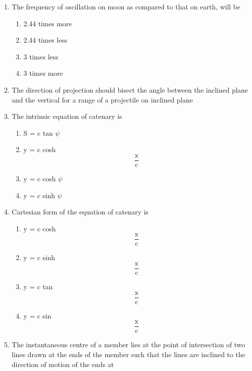 \documentclass[11pt,a4paper]{article}
\begin{document}
\begin{enumerate}
\begin{enumerate}[label=\Alph*.]
\end{enumerate}
\item{The frequency of oscillation on moon as compared to that on earth, will be}
\begin{enumerate}[label=\Alph*.]
\item{2.44 times more}
\item{2.44 times less}
\item{3 times less}
\item{3 times more}
\end{enumerate}
\item{The direction of projection should bisect the angle between the inclined plane and the vertical for a range of a projectile on inclined plane}
\\
\item{The intrinsic equation of catenary is}
\begin{enumerate}[label=\Alph*.]
\item{S = c tan $\psi$}
\item{y = c cosh $$\frac{{\text{x}}}{{\text{c}}}$$}
\item{y = c cosh $\psi$}
\item{y = c sinh $\psi$}
\end{enumerate}
\item{Cartesian form of the equation of catenary is}
\begin{enumerate}[label=\Alph*.]
\item{y = c cosh $$\frac{{\text{x}}}{{\text{c}}}$$}
\item{y = c sinh $$\frac{{\text{x}}}{{\text{c}}}$$}
\item{y = c tan $$\frac{{\text{x}}}{{\text{c}}}$$}
\item{y = c sin $$\frac{{\text{x}}}{{\text{c}}}$$}
\end{enumerate}
\item{The instantaneous centre of a member lies at the point of intersection of two lines drawn at the ends of the member such that the lines are inclined to the direction of motion of the ends at}
\\\begin{enumerate*}[itemjoin=\qquad, label=\Alph*.]

\end{enumerate*}
\end{enumerate}
\end{document}
